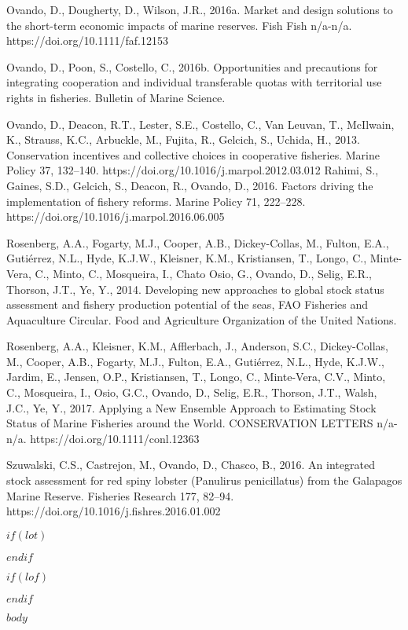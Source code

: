\documentclass[twoside,12pt,final]{ucthesis-CA2012}
\begin{document}
\begin{ucfrontmatter}
\begin{vitae}
Ovando, D., Dougherty, D., Wilson, J.R., 2016a. Market and design solutions to the short-term economic impacts of marine reserves. Fish Fish n/a-n/a. https://doi.org/10.1111/faf.12153

Ovando, D., Poon, S., Costello, C., 2016b. Opportunities and precautions for integrating cooperation and individual transferable quotas with territorial use rights in fisheries. Bulletin of Marine Science.

Ovando, D., Deacon, R.T., Lester, S.E., Costello, C., Van Leuvan, T., McIlwain, K., Strauss, K.C., Arbuckle, M., Fujita, R., Gelcich, S., Uchida, H., 2013. Conservation incentives and collective choices in cooperative fisheries. Marine Policy 37, 132–140. https://doi.org/10.1016/j.marpol.2012.03.012
Rahimi, S., Gaines, S.D., Gelcich, S., Deacon, R., Ovando, D., 2016. Factors driving the implementation of fishery reforms. Marine Policy 71, 222–228. https://doi.org/10.1016/j.marpol.2016.06.005

Rosenberg, A.A., Fogarty, M.J., Cooper, A.B., Dickey-Collas, M., Fulton, E.A., Gutiérrez, N.L., Hyde, K.J.W., Kleisner, K.M., Kristiansen, T., Longo, C., Minte-Vera, C., Minto, C., Mosqueira, I., Chato Osio, G., Ovando, D., Selig, E.R., Thorson, J.T., Ye, Y., 2014. Developing new approaches to global stock status assessment and fishery production potential of the seas, FAO Fisheries and Aquaculture Circular. Food and Agriculture Organization of the United Nations.

Rosenberg, A.A., Kleisner, K.M., Afflerbach, J., Anderson, S.C., Dickey-Collas, M., Cooper, A.B., Fogarty, M.J., Fulton, E.A., Gutiérrez, N.L., Hyde, K.J.W., Jardim, E., Jensen, O.P., Kristiansen, T., Longo, C., Minte-Vera, C.V., Minto, C., Mosqueira, I., Osio, G.C., Ovando, D., Selig, E.R., Thorson, J.T., Walsh, J.C., Ye, Y., 2017. Applying a New Ensemble Approach to Estimating Stock Status of Marine Fisheries around the World. CONSERVATION LETTERS n/a-n/a. https://doi.org/10.1111/conl.12363

Szuwalski, C.S., Castrejon, M., Ovando, D., Chasco, B., 2016. An integrated stock assessment for red spiny lobster (Panulirus penicillatus) from the Galapagos Marine Reserve. Fisheries Research 177, 82–94. https://doi.org/10.1016/j.fishres.2016.01.002


  \end{vitae}
  \begin{abstract}

    $abstract$

  \end{abstract}
	\tableofcontents

	$if(lot)$
  \listoftables
  $endif$

  $if(lof)$
  \listoffigures
  $endif$

\end{ucfrontmatter}

\begin{ucmainmatter}

$body$

\end{ucmainmatter}
\end{document}
